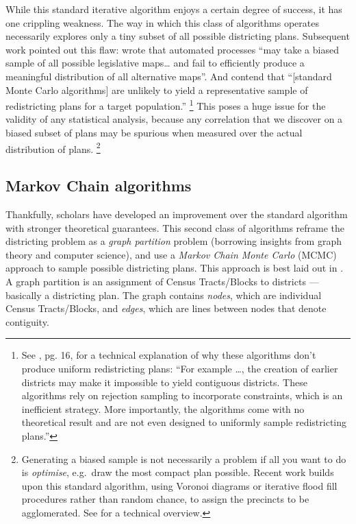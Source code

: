 \documentclass[]{article}
\begin{document}
While this standard iterative algorithm enjoys a certain degree of
success, it has one crippling weakness. The way in which this class of
algorithms operates necessarily explores only a tiny subset of all
possible districting plans. Subsequent work pointed out this flaw:
\citeauthor{mm2018} wrote that automated processes ``may take a biased
sample of all possible legislative maps\ldots{} and fail to efficiently
produce a meaningful distribution of all alternative maps''. And
\citeauthor{fifieldwp} contend that ``{[}standard Monte Carlo
algorithms{]} are unlikely to yield a representative sample of
redistricting plans for a target population.'' \footnote{See
  \cite{fifieldwp}, pg. 16, for a technical explanation of why these
  algorithms don't produce uniform redistricting plans: ``For example
  \ldots{}, the creation of earlier districts may make it impossible to
  yield contiguous districts. These algorithms rely on rejection
  sampling to incorporate constraints, which is an inefficient strategy.
  More importantly, the algorithms come with no theoretical result and
  are not even designed to uniformly sample redistricting plans.''} This
poses a huge issue for the validity of any statistical analysis, because
any correlation that we discover on a biased subset of plans may be
spurious when measured over the actual distribution of plans. \footnote{Generating
  a biased sample is not necessarily a problem if all you want to do is
  \emph{optimise}, e.g.~draw the most compact plan possible. Recent work
  builds upon this standard algorithm, using Voronoi diagrams or
  iterative flood fill procedures rather than random chance, to assign
  the precincts to be agglomerated. See \cite{lf2019} for a technical
  overview.}

\hypertarget{markov-chain-algorithms}{%
\subsection{Markov Chain algorithms}\label{markov-chain-algorithms}}

Thankfully, scholars have developed an improvement over the standard
algorithm with stronger theoretical guarantees. This second class of
algorithms reframe the districting problem as a \emph{graph partition}
problem (borrowing insights from graph theory and computer science), and
use a \emph{Markov Chain Monte Carlo} (MCMC) approach to sample possible
districting plans. This approach is best laid out in \cite{fifieldwp}. A
graph partition is an assignment of Census Tracts/Blocks to districts
--- basically a districting plan. The graph contains \emph{nodes}, which
are individual Census Tracts/Blocks, and \emph{edges}, which are lines
between nodes that denote contiguity.
\end{document}
